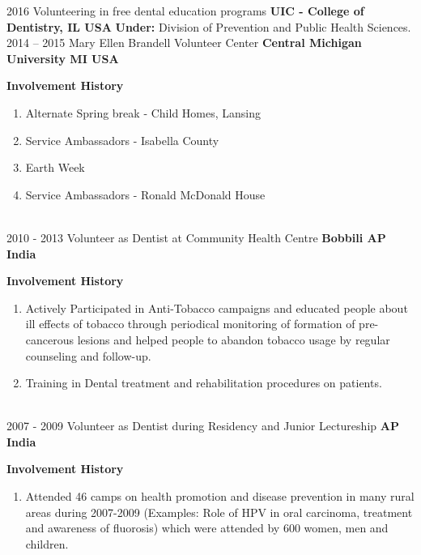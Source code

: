 \documentclass[]{friggeri-cv} %
\begin{document}
\begin{entrylist}
\entry
{2016}
{\large Volunteering in free dental education programs}
{\bf UIC - College of Dentistry, IL USA}
{
	{\bf Under:} Division of Prevention and Public Health Sciences.
}
\\
\entry
{2014 -- 2015}
{\large Mary Ellen Brandell Volunteer Center}
{\bf Central Michigan University MI USA}
{
	{\bf Involvement History}
	\begin{enumerate}
		\item Alternate Spring break - Child Homes, Lansing
		\item Service Ambassadors - Isabella County
		\item Earth Week
		\item Service Ambassadors - Ronald McDonald House
	\end{enumerate}
}
\\
\entry
{2010 - 2013}
{\large Volunteer as Dentist at Community Health Centre}
{\bf Bobbili AP India}
{
	{\bf Involvement History}
	\begin{enumerate}
		\item Actively Participated in Anti-Tobacco campaigns and educated people about ill effects of tobacco through periodical monitoring of formation of pre-cancerous lesions and helped people to abandon tobacco usage by regular counseling and follow-up.
		\item Training in Dental treatment and rehabilitation procedures on patients.
	\end{enumerate}
}
\\
\entry
{2007 - 2009}
{\large Volunteer as Dentist during Residency and Junior Lectureship}
{\bf AP India}
{
	{\bf Involvement History}
	\begin{enumerate}
		\item Attended 46 camps on health promotion and disease prevention in many rural areas during 2007-2009 (Examples: Role of HPV in oral carcinoma, treatment and awareness of fluorosis) which were attended by 600 women, men and children.
	\end{enumerate}
}

\end{entrylist}


\end{document}
